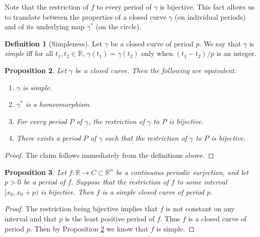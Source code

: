 \documentclass{amsart}
\newtheorem{proposition}{Proposition}[section]
\theoremstyle{definition}
\newtheorem{definition}[proposition]{Definition}
\theoremstyle{remark}
\begin{document}
Note that the restriction of $f$ to every period of $\gamma$ is bijective. This fact allows us to translate between
the properties of a closed curve $\gamma$
(on individual periods) and of its underlying map $\gamma^*$
(on the circle).

\begin{definition}[Simpleness]
    \label{def:simpleness}
    Let $\gamma$ be a closed curve of period $p$.
    We say that $\gamma$ is \emph{simple}
    iff for all $t_1,t_2\in\mathbb{R}$, $\gamma(t_1)=\gamma(t_2)$
    only when $(t_1-t_2)/p$ is an integer.
\end{definition}

\begin{proposition}
    \label{pro:simple_equiv}
    Let $\gamma$ be a closed curve.
    Then the following are equivalent:
    \begin{enumerate}
        \item $\gamma$ is simple.
        \item $\gamma^*$ is a homeomorphism.
        \item For every period $P$ of $\gamma$, the restriction
              of $\gamma$ to $P$ is bijective.
        \item There exists a period $P$ of $\gamma$ such that
              the restriction of $\gamma$ to $P$ is bijective.
    \end{enumerate}
\end{proposition}

\begin{proof}
    The claim follows immediately from the definitions above.
\end{proof}

\begin{proposition}
    \label{pro:simple_suf_cond}
    Let $f:\mathbb{R}\to C\subset\mathbb{R}^n$
    be a continuous periodic surjection,
    and let $p>0$ be a period of $f$. Suppose that
    the restriction of $f$ to some interval $[x_0,x_0+p)$
    is bijective.
    Then $f$ is a simple closed curve of period $p$.
\end{proposition}

\begin{proof}
    The restriction being bijective implies that
    $f$ is not constant on any interval and that
    $p$ is the least positive period of $f$. Thus $f$ is a 
    closed curve of period $p$. Then by Proposition
    \ref{pro:simple_equiv} we know that $f$ is simple.
\end{proof}
\end{document}
